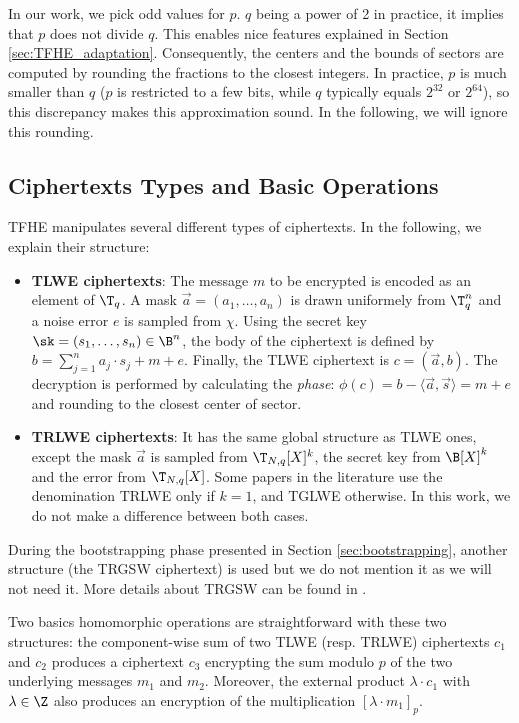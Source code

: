 In our work, we pick odd values for $p$. $q$ being a power of 2 in practice, it implies that $p$ does not divide $q$. This enables nice features explained in Section \ref{sec:TFHE_adaptation}. Consequently, the centers and the bounds of sectors are computed by rounding the fractions to the closest integers. In practice, $p$ is much smaller than $q$ ($p$ is restricted to a few bits, while $q$ typically equals $2^{32}$ or $2^{64}$), so this discrepancy makes this approximation sound. In the following, we will ignore this rounding.


\subsection{Ciphertexts Types and Basic Operations}

TFHE manipulates several different types of ciphertexts. In the following, we explain their structure:

\begin{itemize}
    \item \textbf{TLWE ciphertexts}: The message $m$ to be encrypted is encoded as an element of $\T_q$. A mask $\vec a = (a_1, \dots, a_n)$ is drawn uniformely from $\T_q^n$ and a noise error $e$ is sampled from $\chi$. Using the secret key $\sk = (s_1, \dots, s_n) \in \B^n$, the body of the ciphertext is defined by $b = \sum_{j = 1}^n a_j \cdot s_j + m + e$. Finally, the TLWE ciphertext is $c = (\vec a, b)$. The decryption is performed by calculating the \emph{phase}: $\phi(c) = b - \langle \vec a, \vec s \rangle = m + e$ and rounding to the closest center of sector.\\

    \item \textbf{TRLWE ciphertexts}: It has the same global structure as TLWE ones, except the mask $\vec a$ is sampled from $\T_{N, q}[X]^k$, the secret key from $\B[X]^k$ and the error from $\T_{N, q}[X]$.
    Some papers in the literature use the denomination TRLWE only if $k = 1$, and TGLWE otherwise. In this work, we do not make a difference between both cases.

\end{itemize}


During the bootstrapping phase presented in Section \ref{sec:bootstrapping}, another structure (the TRGSW ciphertext) is used but we do not mention it as we will not need it. More details about TRGSW can be found in \cite{TCHES:Joye22}.


Two basics homomorphic operations are straightforward with these two structures: the component-wise sum of two TLWE (resp. TRLWE) ciphertexts $c_1$ and $c_2$ produces a ciphertext $c_3$ encrypting the sum modulo $p$ of the two underlying messages $m_1$ and $m_2$. Moreover, the external product $\lambda \cdot c_1$ with $\lambda \in \Z$ also produces an encryption of the multiplication $[\lambda \cdot m_1]_p$.


